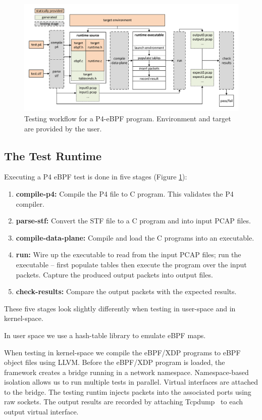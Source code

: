 \begin{figure}
	\centering
	\includegraphics[width=\linewidth]{testing_workflow}
	\caption{Testing workflow for a P4-eBPF program. Environment and
		target are provided by the user.}
	\label{fig:p4_testflow}
\end{figure}

\subsection{The Test Runtime}

Executing a P4 eBPF test is done in five stages (Figure
\ref{fig:p4_testflow}):

\begin{enumerate}
\item\textbf{compile-p4:} Compile the P4 file to C program.  This
  validates the P4 compiler.
\item \textbf{parse-stf:} Convert the STF file to a C program and into
  input PCAP files.
\item \textbf{compile-data-plane:} Compile and load the C programs
  into an executable.
\item \textbf{run:} Wire up the executable to read from the input PCAP
  files; run the executable -- first populate tables then execute the
  program over the input packets.  Capture the produced output packets
  into output files.
\item \textbf{check-results:} Compare the output packets with the
  expected results.
\end{enumerate}

\noindent These five stages look slightly differently when testing in
user-space and in kernel-space.

In user space we use a hash-table library to emulate eBPF maps.

When testing in kernel-space we compile the eBPF/XDP programs to eBPF
object files using LLVM.  Before the eBPF/XDP program is loaded, the
framework creates a bridge running in a network namespace.
Namespace-based isolation allows us to run multiple tests in parallel.
Virtual interfaces are attached to the bridge.  The testing runtim
injects packets into the associated ports using raw sockets. The
output results are recorded by attaching Tcpdump~\cite{tcpdump} to
each output virtual interface.
